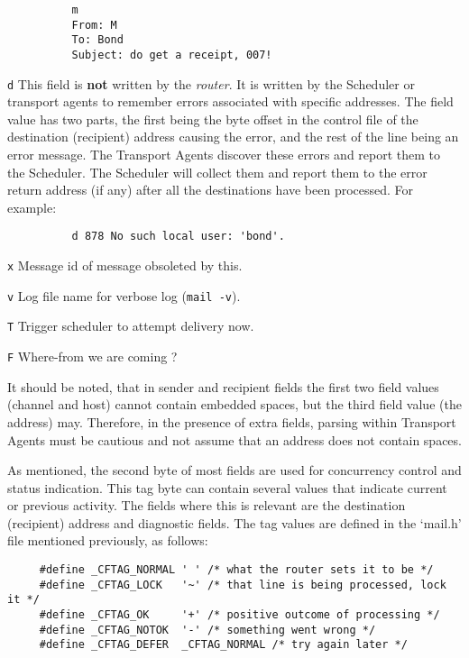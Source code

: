\begin{tscreen}
\begin{verbatim}
          m
          From: M
          To: Bond
          Subject: do get a receipt, 007!
\end{verbatim}
\end{tscreen}


{\tt d}     
This field is {\bf not} written by the {\em router\/}.  It is written by the
Scheduler or transport agents to remember errors associated with specific addresses. The
field value has two parts, the first being the byte offset in the
control file of the destination (recipient) address causing the error,
and the rest of the line being an error message.  The Transport Agents
discover these errors and report them to the Scheduler.  The Scheduler
will collect them and report them to the error return address (if any)
after all the destinations have been processed.
For example:
\begin{tscreen}
\begin{verbatim}
          d 878 No such local user: 'bond'.
\end{verbatim}
\end{tscreen}
     

{\tt x}
Message id of message obsoleted by this.

{\tt v}
Log file name for verbose log ({\tt mail -v}).

{\tt T}
Trigger scheduler to attempt delivery now.

{\tt F}
Where-from we are coming ?               

It should be noted, that in sender and recipient fields the first two field
values (channel and host) cannot contain embedded spaces, but the third
field value (the address) may.  Therefore, in the presence of extra fields,
parsing within Transport Agents must be cautious and not assume that an
address does not contain spaces.

As mentioned, the second byte of most fields are used for concurrency
control and status indication.  This tag byte can contain several values
that indicate current or previous activity.  The fields where this is
relevant are the destination (recipient) address and diagnostic fields.
The tag values are defined in the `mail.h' file mentioned previously, as
follows:
\begin{tscreen}
\begin{verbatim}
     #define _CFTAG_NORMAL ' ' /* what the router sets it to be */
     #define _CFTAG_LOCK   '~' /* that line is being processed, lock it */
     #define _CFTAG_OK     '+' /* positive outcome of processing */
     #define _CFTAG_NOTOK  '-' /* something went wrong */
     #define _CFTAG_DEFER  _CFTAG_NORMAL /* try again later */
\end{verbatim}
\end{tscreen}

